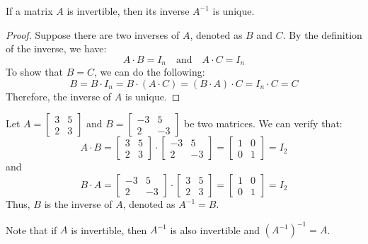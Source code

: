 \begin{theorem}
    If a matrix $A$ is invertible, then its inverse $A^{-1}$ is unique.
\end{theorem}
\begin{proof}
    Suppose there are two inverses of $A$, denoted as $B$ and $C$. By the definition of the inverse, we have:
    \[
        A \cdot B = I_n \quad \text{and} \quad A \cdot C = I_n
    \]
    To show that $B = C$, we can do the following:
    \[
        B = B \cdot I_n = B \cdot (A \cdot C) = (B \cdot A) \cdot C = I_n \cdot C = C
    \]
    Therefore, the inverse of $A$ is unique.
\end{proof}
\begin{eg}
    Let $A = \begin{bmatrix}
        3 & 5 \\
        2 & 3
    \end{bmatrix}$ and $B = \begin{bmatrix}
        -3 & 5 \\
        2 & -3
    \end{bmatrix}$ be two matrices. We can verify that:
    \[
        A \cdot B = \begin{bmatrix}
            3 & 5 \\
            2 & 3
        \end{bmatrix} \cdot \begin{bmatrix}
            -3 & 5 \\
            2 & -3
        \end{bmatrix} = \begin{bmatrix}
            1 & 0 \\
            0 & 1
        \end{bmatrix} = I_2
    \]
    and
    \[
        B \cdot A = \begin{bmatrix}
            -3 & 5 \\
            2 & -3
        \end{bmatrix} \cdot \begin{bmatrix}
            3 & 5 \\
            2 & 3
        \end{bmatrix} = \begin{bmatrix}
            1 & 0 \\
            0 & 1
        \end{bmatrix} = I_2
    \]
    Thus, $B$ is the inverse of $A$, denoted as $A^{-1} = B$.
\end{eg}
Note that if $A$ is invertible, then $A^{-1}$ is also invertible and $(A^{-1})^{-1} = A$.

